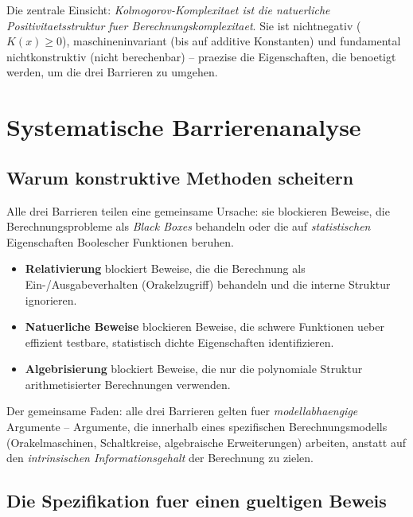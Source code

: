 \documentclass[aps,prd,twocolumn,superscriptaddress,nofootinbib]{revtex4-2}
\theoremstyle{definition}
\theoremstyle{remark}
\begin{document}
Die zentrale Einsicht: \textit{Kolmogorov-Komplexitaet ist die natuerliche Positivitaetsstruktur fuer Berechnungskomplexitaet}. Sie ist nichtnegativ ($K(x) \geq 0$), maschineninvariant (bis auf additive Konstanten) und fundamental nichtkonstruktiv (nicht berechenbar) -- praezise die Eigenschaften, die benoetigt werden, um die drei Barrieren zu umgehen.


\section{Systematische Barrierenanalyse}
\label{sec:barriers}

\subsection{Warum konstruktive Methoden scheitern}

Alle drei Barrieren teilen eine gemeinsame Ursache: sie blockieren Beweise, die Berechnungsprobleme als \textit{Black Boxes} behandeln oder die auf \textit{statistischen} Eigenschaften Boolescher Funktionen beruhen.

\begin{itemize}
\item \textbf{Relativierung} blockiert Beweise, die die Berechnung als Ein-/Ausgabeverhalten (Orakelzugriff) behandeln und die interne Struktur ignorieren.
\item \textbf{Natuerliche Beweise} blockieren Beweise, die schwere Funktionen ueber effizient testbare, statistisch dichte Eigenschaften identifizieren.
\item \textbf{Algebrisierung} blockiert Beweise, die nur die polynomiale Struktur arithmetisierter Berechnungen verwenden.
\end{itemize}

Der gemeinsame Faden: alle drei Barrieren gelten fuer \textit{modellabhaengige} Argumente -- Argumente, die innerhalb eines spezifischen Berechnungsmodells (Orakelmaschinen, Schaltkreise, algebraische Erweiterungen) arbeiten, anstatt auf den \textit{intrinsischen Informationsgehalt} der Berechnung zu zielen.

\subsection{Die Spezifikation fuer einen gueltigen Beweis}
\end{document}
